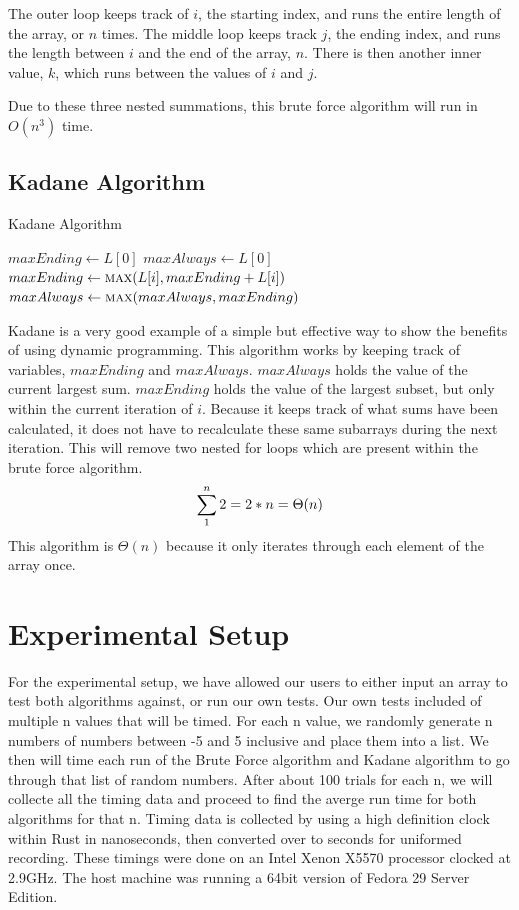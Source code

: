 \documentclass[10pt, letterpaper]{article}
\begin{document}
	The outer loop keeps track of $i$, the starting index, and runs the entire length of the array, or $n$ times.
	The middle loop keeps track $j$, the ending index, and runs the length between $i$ and the end of the array, $n$.
	There is then another inner value, $k$, which runs between the values of $i$ and $j$.

	Due to these three nested summations, this brute force algorithm will run in $O(n^3)$ time.

	\subsection{Kadane Algorithm}

  \begin{algorithm}
		\caption{Kadane Algorithm}\label{kadane}
	\begin{algorithmic}
    \State $maxEnding \gets L[0]$
    \State $maxAlways \gets L[0]$
    \State $maxEnding \gets \Call{max}{L[i], maxEnding + L[i]}$
    \State $maxAlways \gets \Call{max}{maxAlways, maxEnding}$
    \EndFor
	  \EndFunction
	\end{algorithmic}
	\end{algorithm}

  Kadane is a very good example of a simple but effective way to show the benefits of using dynamic programming.
  This algorithm works by keeping track of variables, $maxEnding$ and $maxAlways$.
  $maxAlways$ holds the value of the current largest sum.
  $maxEnding$ holds the value of the largest subset, but only within the current iteration of $i$.
  Because it keeps track of what sums have been calculated, it does not have to recalculate these same subarrays during the next iteration.
  This will remove two nested for loops which are present within the brute force algorithm.
  \\
  \[
  \sum_1^n2 \\
  = 2 * n \\
  = \Theta(n)
		\]
	  This algorithm is $\Theta(n)$ because it only iterates through each element of the array once.
    \\
	  \section{Experimental Setup}

	For the experimental setup, we have allowed our users to either input an array to test both algorithms against, or run our own tests.
  Our own tests included of multiple n values that will be timed. For each n value, we randomly generate n numbers of numbers between -5 and 5 inclusive and place them into a list. We then will time each run of the Brute Force algorithm and Kadane algorithm to go through that list of random numbers. After about 100 trials for each n, we will collecte all the timing data and proceed to find the averge run time for both algorithms for that n.
  Timing data is collected by using a high definition clock within Rust in nanoseconds, then converted over to seconds for uniformed recording. These timings were done on an Intel Xenon X5570 processor clocked at 2.9GHz. The host machine was running a 64bit version of Fedora 29 Server Edition.
\\
\end{document}
